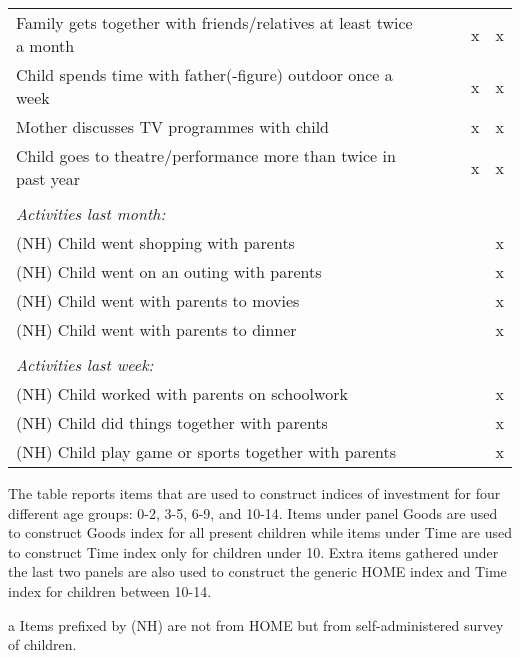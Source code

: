 {\begin{threeparttable}
\begin{tabularx}{.97\linewidth}{|l| *{4}{Y|}}
		\hspace{3mm} Family gets together with friends/relatives at least twice a month & & & x & x \\
		\hspace{3mm} Child spends time with father(-figure) outdoor once a week & & & x & x \\
		\hspace{3mm} Mother discusses TV programmes with child & & & x & x \\
		\hspace{3mm} Child goes to theatre/performance more than twice in past year & & & x & x \\
		& & & & \\
		\textit{Activities last month:} & & & & \\
		\hspace{3mm} (NH) Child went shopping with parents & & & & x \\
		\hspace{3mm} (NH) Child went on an outing with parents & & & & x \\
		\hspace{3mm} (NH) Child went with parents to movies & & & & x \\
		\hspace{3mm} (NH) Child went with parents to dinner& & & & x \\
		& & & & \\
		\textit{Activities last week:} & & & & \\
		\hspace{3mm} (NH) Child worked with parents on schoolwork & & & & x  \\
		\hspace{3mm} (NH) Child did things together with parents & & & & x  \\	
		\hspace{3mm} (NH) Child play game or sports together with parents & & & & x  \\
		\hline			
	\end{tabularx}
	\begin{tablenotes}[flushleft]\footnotesize
		\item The table reports items that are used to construct indices of investment for four different age groups: 0-2, 3-5, 6-9, and 10-14. Items under panel Goods are used to construct Goods index for all present children while items under Time are used to construct Time index only for children under 10. Extra items gathered under the last two panels are also used to construct the generic HOME index and Time index for children between 10-14.
		\item[a] Items prefixed by (NH) are not from HOME but from self-administered survey of children.
	\end{tablenotes}
\end{threeparttable}
}